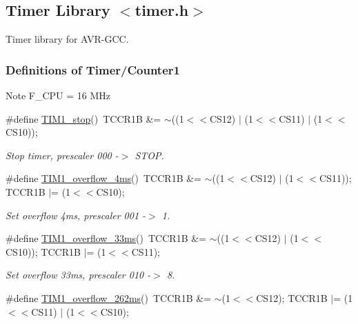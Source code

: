 \hypertarget{a00013}{}\subsection{Timer Library $<$timer.\+h$>$}
\label{a00013}


Timer library for A\+V\+R-\/\+G\+CC.  


\subsubsection*{Definitions of Timer/\+Counter1}
\label{_amgrp446a33d1fb2676394cd3037c2ddc3759}%
\begin{DoxyNote}{Note}
F\+\_\+\+C\+PU = 16 M\+Hz 
\end{DoxyNote}
\begin{DoxyCompactItemize}
\item 
\#define \hyperlink{a00013_ga85dff9eee7b0f0cc8a8a1d13793742a3}{T\+I\+M1\+\_\+stop}()~T\+C\+C\+R1B \&= $\sim$((1$<$$<$C\+S12) $\vert$ (1$<$$<$C\+S11) $\vert$ (1$<$$<$C\+S10));\hypertarget{a00013_ga85dff9eee7b0f0cc8a8a1d13793742a3}{}\label{a00013_ga85dff9eee7b0f0cc8a8a1d13793742a3}

\begin{DoxyCompactList}\small\item\em Stop timer, prescaler 000 -\/$>$ S\+T\+OP. \end{DoxyCompactList}\item 
\#define \hyperlink{a00013_ga1193ba83b972f64ffc89d54dd9cb3d88}{T\+I\+M1\+\_\+overflow\+\_\+4ms}()~T\+C\+C\+R1B \&= $\sim$((1$<$$<$C\+S12) $\vert$ (1$<$$<$C\+S11)); T\+C\+C\+R1B $\vert$= (1$<$$<$C\+S10);\hypertarget{a00013_ga1193ba83b972f64ffc89d54dd9cb3d88}{}\label{a00013_ga1193ba83b972f64ffc89d54dd9cb3d88}

\begin{DoxyCompactList}\small\item\em Set overflow 4ms, prescaler 001 -\/$>$ 1. \end{DoxyCompactList}\item 
\#define \hyperlink{a00013_ga35693ced5c9f4a0b669ac24ceca8e69b}{T\+I\+M1\+\_\+overflow\+\_\+33ms}()~T\+C\+C\+R1B \&= $\sim$((1$<$$<$C\+S12) $\vert$ (1$<$$<$C\+S10)); T\+C\+C\+R1B $\vert$= (1$<$$<$C\+S11);\hypertarget{a00013_ga35693ced5c9f4a0b669ac24ceca8e69b}{}\label{a00013_ga35693ced5c9f4a0b669ac24ceca8e69b}

\begin{DoxyCompactList}\small\item\em Set overflow 33ms, prescaler 010 -\/$>$ 8. \end{DoxyCompactList}\item 
\#define \hyperlink{a00013_ga77e94f0031880610c8fdbc9a0257ef09}{T\+I\+M1\+\_\+overflow\+\_\+262ms}()~T\+C\+C\+R1B \&= $\sim$(1$<$$<$C\+S12); T\+C\+C\+R1B $\vert$= (1$<$$<$C\+S11) $\vert$ (1$<$$<$C\+S10);\hypertarget{a00013_ga77e94f0031880610c8fdbc9a0257ef09}{}\label{a00013_ga77e94f0031880610c8fdbc9a0257ef09}


\end{DoxyCompactItemize}
